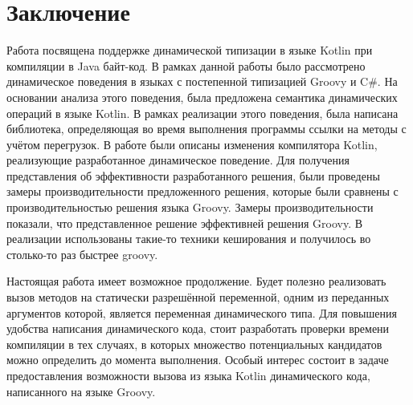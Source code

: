 \vfill
\clearpage
\section*{Заключение}


Работа посвящена поддержке динамической типизации в языке Kotlin при компиляции в Java байт-код.
В рамках данной работы было рассмотрено динамическое поведения в языках с постепенной типизацией Groovy и C\#. На основании анализа этого поведения, была предложена семантика динамических операций в языке Kotlin. В рамках реализации этого поведения, была написана библиотека, определяющая во время выполнения программы ссылки на методы с учётом перегрузок. В работе были описаны изменения компилятора Kotlin, реализующие разработанное динамическое поведение. Для получения представления об эффективности разработанного решения, были проведены замеры производительности предложенного решения, которые были сравнены с производительностью решения языка Groovy.
Замеры производительности показали, что представленное решение эффективней решения Groovy.
В реализации использованы такие-то техники кеширования и получилось во столько-то раз быстрее groovy.


Настоящая работа имеет возможное продолжение. Будет полезно реализовать вызов методов на статически разрешённой переменной, одним из переданных аргументов которой, является переменная динамического типа. Для повышения удобства написания динамического кода, стоит разработать проверки времени компиляции в тех случаях, в которых множество потенциальных кандидатов можно определить до момента выполнения. Особый интерес состоит в задаче предоставления возможности вызова из языка Kotlin динамического кода, написанного на языке Groovy.

